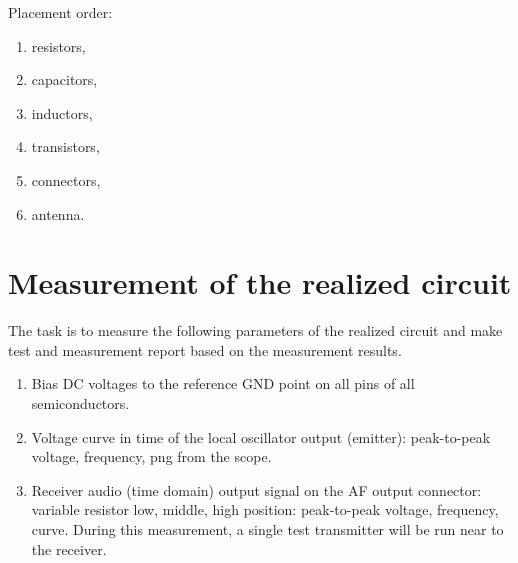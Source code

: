 Placement order:

\begin{enumerate}
\item resistors,
\item capacitors,
\item inductors,
\item transistors,
\item connectors,
\item antenna.
\end{enumerate}

\newpage
\section{Measurement of the realized circuit}

The task is to measure the following parameters of the realized circuit and make test and measurement report based on the measurement results.

\begin{enumerate}
\item Bias DC voltages to the reference GND point on all pins of all semiconductors.
\item Voltage curve in time of the local oscillator output (emitter): peak-to-peak voltage, frequency, png from the scope.
\item Receiver audio (time domain) output signal on the AF output connector: variable resistor low, middle, high position: peak-to-peak voltage, frequency, curve. During this measurement, a single test transmitter will be run near to the receiver.
\end{enumerate}